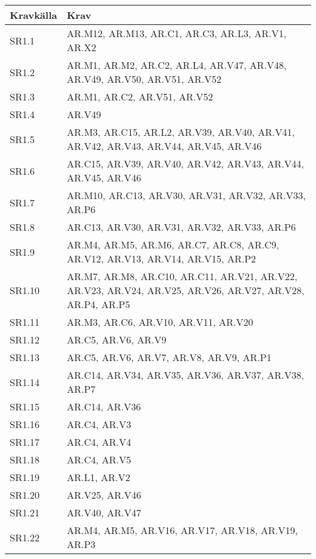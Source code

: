 \documentclass[a4paper, twoside, 11pt, titlepage]{article}
\begin{document}
	\begin {table} [ht] \begin{tabular} {  p{2cm} p{13cm} }
		\hline
		{\sffamily\textbf{Kravkälla}} & {\sffamily\textbf{Krav}} \\
		\hline
		{SR1.1} & {AR.M12, AR.M13, AR.C1, AR.C3, AR.L3, AR.V1, AR.X2} \\
		\hline
		{SR1.2} & {AR.M1, AR.M2, AR.C2, AR.L4, AR.V47, AR.V48, AR.V49, AR.V50, AR.V51, AR.V52} \\
		\hline
		{SR1.3} & {AR.M1, AR.C2, AR.V51, AR.V52} \\
		\hline
		{SR1.4} & {AR.V49} \\
		\hline
		{SR1.5} & {AR.M3, AR.C15, AR.L2, AR.V39, AR.V40, AR.V41, AR.V42, AR.V43, AR.V44, AR.V45, AR.V46} \\
		\hline
		{SR1.6} & {AR.C15, AR.V39, AR.V40, AR.V42, AR.V43, AR.V44, AR.V45, AR.V46} \\
		\hline
		{SR1.7} & {AR.M10, AR.C13, AR.V30, AR.V31, AR.V32, AR.V33, AR.P6} \\
		\hline
		{SR1.8} & {AR.C13, AR.V30, AR.V31, AR.V32, AR.V33, AR.P6} \\
		\hline
		{SR1.9} & {AR.M4, AR.M5, AR.M6, AR.C7, AR.C8, AR.C9, AR.V12, AR.V13, AR.V14, AR.V15, AR.P2} \\
		\hline
		{SR1.10} & {AR.M7, AR.M8, AR.C10, AR.C11, AR.V21, AR.V22, AR.V23, AR.V24, AR.V25, AR.V26, AR.V27, AR.V28, AR.P4, AR.P5} \\
		\hline
		{SR1.11} & {AR.M3, AR.C6, AR.V10, AR.V11, AR.V20} \\
		\hline
		{SR1.12} & {AR.C5, AR.V6, AR.V9} \\
		\hline
		{SR1.13} & {AR.C5, AR.V6, AR.V7, AR.V8, AR.V9, AR.P1} \\
		\hline
		{SR1.14} & {AR.C14, AR.V34, AR.V35, AR.V36, AR.V37, AR.V38, AR.P7} \\
		\hline
		{SR1.15} & {AR.C14, AR.V36} \\
		\hline
		{SR1.16} & {AR.C4, AR.V3} \\
		\hline
		{SR1.17} & {AR.C4, AR.V4} \\
		\hline
		{SR1.18} & {AR.C4, AR.V5} \\
		\hline
		{SR1.19} & {AR.L1, AR.V2} \\
		\hline
		{SR1.20} & {AR.V25, AR.V46} \\
		\hline
		{SR1.21} & {AR.V40, AR.V47} \\
		\hline
		{SR1.22} & {AR.M4, AR.M5, AR.V16, AR.V17, AR.V18, AR.V19, AR.P3} \\

\end{tabular}
\end{table}
\end{document}
